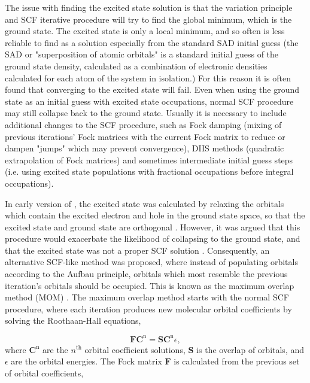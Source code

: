 The issue with finding the excited state solution is that the variation principle
and SCF iterative procedure will try to find the global minimum, which is the ground
state. The excited state is only a local minimum, and so often is less reliable
to find as a solution especially from the standard SAD initial guess \cite{Almlof1982} 
(the SAD or "superposition of atomic orbitals" is a standard initial guess of the
ground state density, calculated as a combination of electronic densities calculated
for each atom of the system in isolation.) For this reason it is often found that 
converging to the \dscf excited state will fail. Even when using the ground state 
as an initial guess with excited state occupations, normal SCF procedure may still 
collapse back to the ground state. Usually it is necessary to include additional 
changes to the SCF procedure, such as Fock damping (mixing of previous iterations'
Fock matrices with the current Fock matrix to reduce or dampen "jumps" which may
prevent convergence), DIIS methods (quadratic extrapolation of Fock matrices) and
sometimes intermediate initial guess steps (i.e. using excited state populations 
with fractional occupations before integral occupations).

In early version of \dscf, the excited state was calculated by relaxing the orbitals
which contain the excited electron and hole in the ground state space, so that the
excited state and ground state are orthogonal \cite{Hunt1969}. However, it was
argued that this procedure would exacerbate the likelihood of collapsing to the ground
state, and that the excited state was not a proper SCF solution \cite{Gilbert2008}.
Consequently, an alternative SCF-like method was proposed, where instead of populating orbitals 
according to the Aufbau principle, orbitals which most resemble the previous iteration's
orbitals should be occupied. This is known as the maximum overlap method (MOM) \cite{Gilbert2008}. 
The maximum overlap method starts with the normal SCF procedure, where each iteration
produces new molecular orbital coefficients by solving the Roothaan-Hall equations, \cite{Roothaan1951}

\begin{equation}
\mathbf{F} \mathbf{C}^{\text{n}} = \mathbf{S} \mathbf{C}^{\text{n}} \epsilon,
\label{eq:roothaan_hall}
\end{equation}
%
where $\mathbf{C}^{\text{n}}$ are the $n^{\text{th}}$ orbital coefficient solutions, 
$\mathbf{S}$ is the overlap of orbitals, and $\epsilon$ are the orbital energies. 
The Fock matrix $\mathbf{F}$ is calculated from the previous set of orbital coefficients,

